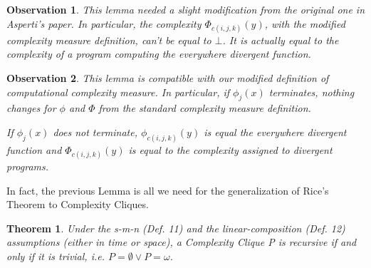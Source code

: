 \documentclass[10pt, a4paper, oneside, titlepage, draft]{article}
\newtheorem{observation}{Observation}[shrd]
\newtheorem{theorem}[shrd]{Theorem}
\begin{document}
\begin{observation}
    This lemma needed a slight modification from the original one in Asperti's paper. In particular, the complexity $\Phi_{c(i,j,k)}(y)$, with the modified complexity measure definition, can't be equal to $\bot$. It is actually equal to the complexity of a program computing the everywhere divergent function.
\end{observation}

\begin{observation}
    This lemma is compatible with our modified definition of computational complexity measure. In particular, if $\phi_j(x)$ terminates, nothing changes for $\phi$ and $\Phi$ from the standard complexity measure definition.

    If $\phi_j(x)$ does not terminate, $\phi_{c(i,j,k)}(y)$ is equal the everywhere divergent function and $\Phi_{c(i,j,k)}(y)$ is equal to the complexity assigned to divergent programs.
\end{observation}

In fact, the previous Lemma is all we need for the generalization of Rice's Theorem to Complexity Cliques.

\begin{theorem}
    Under the s-m-n (Def. 11) and the linear-composition (Def. 12) assumptions (either in time or space), a Complexity Clique P is recursive if and only if it is trivial, i.e. $P = \emptyset \vee P = \omega$.
\end{theorem}
\end{document}
